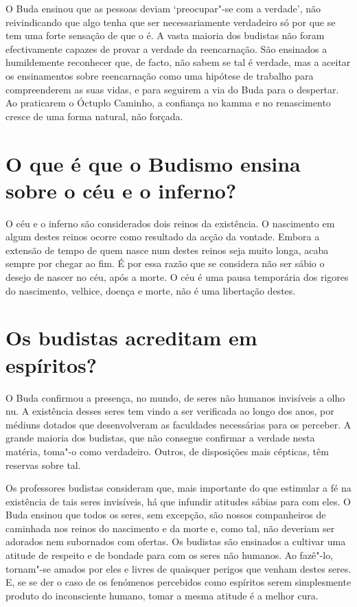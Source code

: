 O Buda ensinou que as pessoas deviam `preocupar"-se com a verdade', não
reivindicando que algo tenha que ser necessariamente verdadeiro só por
que se tem uma forte sensação de que o é. A vasta maioria dos budistas
não foram efectivamente capazes de provar a verdade da reencarnação. São
ensinados a humildemente reconhecer que, de facto, não sabem se tal é
verdade, mas a aceitar os ensinamentos sobre reencarnação como uma
hipótese de trabalho para compreenderem as suas vidas, e para seguirem a
via do Buda para o despertar. Ao praticarem o Óctuplo Caminho, a
confiança no kamma e no renascimento cresce de uma forma natural, não
forçada.

\section{O que é que o Budismo ensina sobre o céu e o inferno?}

O céu e o inferno são considerados dois reinos da existência. O
nascimento em algum destes reinos ocorre como resultado da acção da
vontade. Embora a extensão de tempo de quem nasce num destes reinos seja
muito longa, acaba sempre por chegar ao fim. É por essa razão que se
considera não ser sábio o desejo de nascer no céu, após a morte. O céu é
uma pausa temporária dos rigores do nascimento, velhice, doença e morte,
não é uma libertação destes.

\section{Os budistas acreditam em espíritos?}

O Buda confirmou a presença, no mundo, de seres não humanos invisíveis a
olho nu. A existência desses seres tem vindo a ser verificada ao longo
dos anos, por médiuns dotados que desenvolveram as faculdades
necessárias para os perceber. A grande maioria dos budistas, que não
consegue confirmar a verdade nesta matéria, toma"-o como verdadeiro.
Outros, de disposições mais cépticas, têm reservas sobre tal.

Os professores budistas consideram que, mais importante do que estimular
a fé na existência de tais seres invisíveis, há que infundir atitudes
sábias para com eles. O Buda ensinou que todos os seres, sem excepção, são
nossos companheiros de caminhada nos reinos do nascimento e da morte e,
como tal, não deveriam ser adorados nem subornados com ofertas. Os
budistas são ensinados a cultivar uma atitude de respeito e de bondade
para com os seres não humanos. Ao fazê"-lo, tornam"-se amados por eles e
livres de quaisquer perigos que venham destes seres. E, se se der o caso
de os fenómenos percebidos como espíritos serem simplesmente produto do
inconsciente humano, tomar a mesma atitude é a melhor cura.

